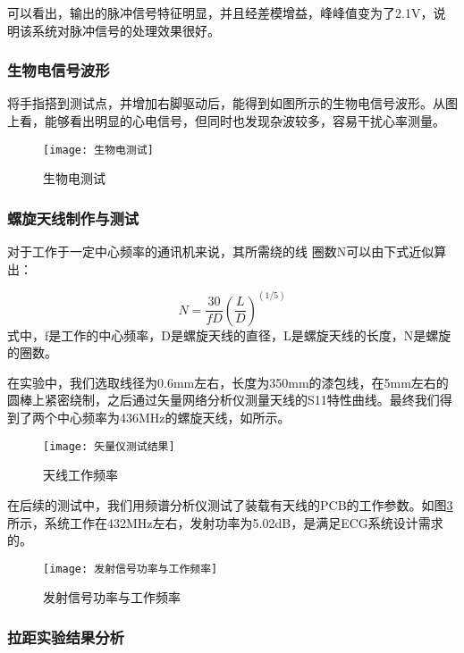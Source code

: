\documentclass{zjureport}
\begin{document}
可以看出，输出的脉冲信号特征明显，并且经差模增益，峰峰值变为了2.1V，说明该系统对脉冲信号的处理效果很好。

\subsubsection{生物电信号波形}

将手指搭到测试点，并增加右脚驱动后，能得到如图所示的生物电信号波形。从图上看，能够看出明显的心电信号，但同时也发现杂波较多，容易干扰心率测量。

\begin{figure}[h]
	\centering%
	\texttt{[image: 生物电测试]}
	\caption{生物电测试}%
	\label{生物电测试}%
\end{figure}

\subsubsection{螺旋天线制作与测试}

对于工作于一定中心频率的通讯机来说，其所需绕的线
圈数N可以由下式近似算出：

\begin{equation}
	N=\frac{30}{fD}(\frac{L}{D})^(1/5)
\end{equation}
式中，f是工作的中心频率，D是螺旋天线的直径，L是螺旋天线的长度，N是螺旋的圈数。

在实验中，我们选取线径为0.6mm左右，长度为350mm的漆包线，在5mm左右的圆棒上紧密绕制，之后通过矢量网络分析仪测量天线的S11特性曲线。最终我们得到了两个中心频率为436MHz的螺旋天线，如所示。

\begin{figure}[h]
	\centering%
	\texttt{[image: 矢量仪测试结果]}
	\caption{天线工作频率}%
	\label{天线工作频率}%
\end{figure}

在后续的测试中，我们用频谱分析仪测试了装载有天线的PCB的工作参数。如图\ref{发射信号功率与工作频率}所示，系统工作在432MHz左右，发射功率为5.02dB，是满足ECG系统设计需求的。

\begin{figure}[h]
	\centering%
	\texttt{[image: 发射信号功率与工作频率]}
	\caption{发射信号功率与工作频率}%
	\label{发射信号功率与工作频率}%
\end{figure}

\subsubsection{拉距实验结果分析}
\end{document}
